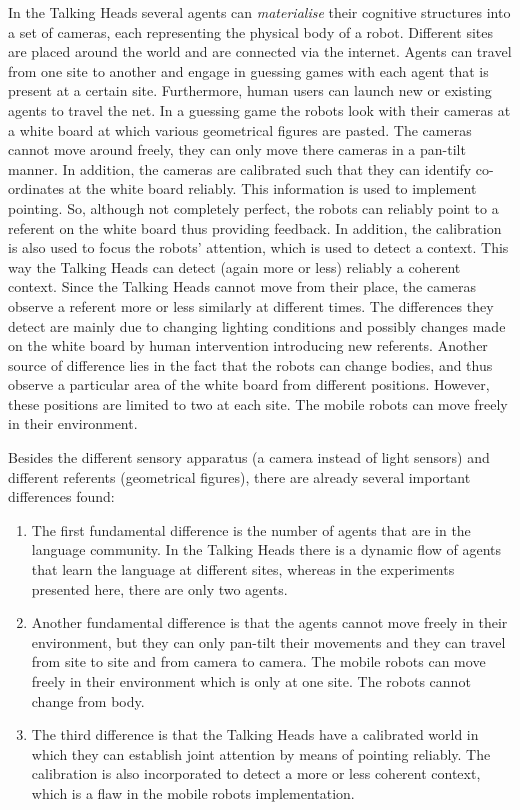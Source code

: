 In the Talking Heads several agents can {\em materialise} their cognitive structures into a set of cameras, each representing the physical body of a robot. Different sites are placed around the world and are connected via the internet. Agents can travel from one site to another and engage in guessing games with each agent that is present at a certain site. Furthermore, human users can launch new or existing agents to travel the net. In a guessing game the robots look with their cameras at a white board at which various geometrical figures are pasted. The cameras cannot move around freely, they can only move there cameras in a pan-tilt manner. In addition, the cameras are calibrated such that they can identify co-ordinates at the white board reliably. This information is used to implement pointing. So, although not completely perfect, the robots can reliably point to a referent on the white board thus providing feedback. In addition, the calibration is also used to focus the robots' attention, which is used to detect a context. This way the Talking Heads can detect (again more or less) reliably a coherent context. Since the Talking Heads cannot move from their place, the cameras observe a referent more or less similarly at different times. The differences they detect are mainly due to changing lighting conditions and possibly changes made on the white board by human intervention introducing new referents. Another source of difference lies in the fact that the robots can change bodies, and thus observe a particular area of the white board from different positions. However, these positions are limited to two at each site. The mobile robots can move freely in their environment.

Besides the different sensory apparatus (a camera instead of light sensors) and different referents (geometrical figures), there are already several important differences found:

\begin{enumerate}
\item The first fundamental difference is the number of agents that are in the language community. In the Talking Heads there is a dynamic flow of agents that learn the language at different sites, whereas in the experiments presented here, there are only two agents. 
\item Another fundamental difference is that the agents cannot move freely in their environment, but they can only pan-tilt their movements and they can travel from site to site and from camera to camera. The mobile robots can move freely in their environment which is only at one site. The robots cannot change from body. 
\item The third difference is that the Talking Heads have a calibrated world in which they can establish joint attention by means of pointing reliably. The calibration is also incorporated to detect a more or less coherent context, which is a flaw in the mobile robots implementation.
\end{enumerate}

